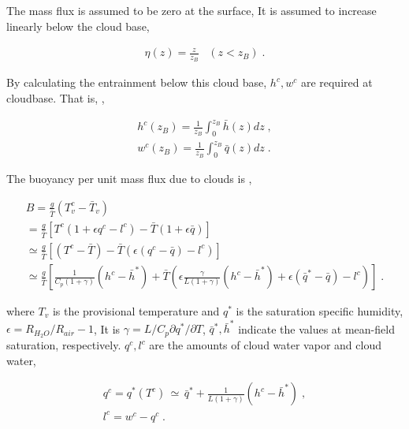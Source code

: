 The mass flux is assumed to be zero at the surface, It is assumed to
increase linearly below the cloud base,

\begin{eqnarray}
 \eta (z) =   \frac{z}{z_B} \; \; \; ( z<z_B ) \; .
\end{eqnarray}

By calculating the entrainment below this cloud base, \(h^c,w^c\) are
required at cloudbase. That is, ,

\begin{eqnarray}
  h^c(z_B)  =  \frac{1}{z_B} \int_0^{z_B} \bar{h}(z) dz \; , \\
  w^c(z_B)  =  \frac{1}{z_B} \int_0^{z_B} \bar{q}(z) dz \; .
\end{eqnarray}

The buoyancy per unit mass flux due to clouds is ,

\begin{eqnarray}
   B  =   \frac{g}{\bar{T}} ( T_v^c - \bar{T}_v ) \\
      =   \frac{g}{\bar{T}} 
            \left[ T^c ( 1+\epsilon q^c-l^c ) 
                      - \bar{T} ( 1+\epsilon \bar{q} ) \right] \\
      \simeq  \frac{g}{\bar{T}} 
               \left[ ( T^c - \bar{T} ) 
               - \bar{T} \left( \epsilon(q^c-\bar{q}) -l^c \right) 
                                                     \right] \\
      \simeq  \frac{g}{\bar{T}} 
                \left[ \frac{1}{C_p(1+\gamma)} (h^c-\bar{h}^*)
                       + \bar{T} \left( \epsilon \frac{\gamma}{L(1+\gamma)} 
                                                     (h^c-\bar{h}^*)
                               + \epsilon (\bar{q}^* - \bar{q} ) 
                               - l^c                      \right) \right] \; .
\end{eqnarray}

where \(T_v\) is the provisional temperature and \(q^*\) is the
saturation specific humidity, \(\epsilon = R_{{H}_2{O}}/R_{{air}} -1\),
It is \(\gamma = L/C_p \partial q^*/\partial T\),
\(\bar{q}^*, \bar{h}^*\) indicate the values at mean-field saturation,
respectively. \(q^c, l^c\) are the amounts of cloud water vapor and
cloud water,

\begin{eqnarray}
  q^c  =  q^*(T^c) \, \simeq \,
           \bar{q}^* + \frac{1}{L(1+\gamma)} ( h^c - \bar{h}^* ) \; , \\  
  l^c  =  w^c - q^c \; .
\end{eqnarray}

